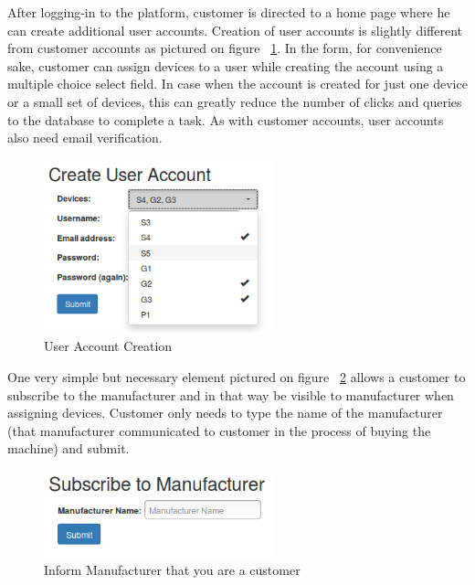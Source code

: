  After logging-in to the platform, customer is directed to a home page where he can create additional user accounts. Creation of user accounts is slightly different from customer accounts as pictured on figure ~\ref{fig:CreateUser}. In the form, for convenience sake, customer can assign devices to a user while creating the account using a multiple choice select field. In case when the account is created for just one device or a small set of devices, this can greatly reduce the number of clicks and queries to the database to complete a task. As with customer accounts, user accounts also need email verification.

\begin{figure}[ht]
	\begin{center}
		\includegraphics[width=0.6\textwidth]{images/implementation/CreateUser}
		\caption{User Account Creation}
		\label{fig:CreateUser}
	\end{center}
\end{figure}

One very simple but necessary element pictured on figure ~\ref{fig:SubscribeToManufacturer} allows a customer to subscribe to the manufacturer and in that way be visible to manufacturer when assigning devices. Customer only needs to type the name of the manufacturer (that manufacturer communicated to customer in the process of buying the machine) and submit.

\begin{figure}[ht]
	\begin{center}
		\includegraphics[width=0.6\textwidth]{images/implementation/SubscribeToManufacturer}
		\caption{Inform Manufacturer that you are a customer}
		\label{fig:SubscribeToManufacturer}
	\end{center}
\end{figure}

